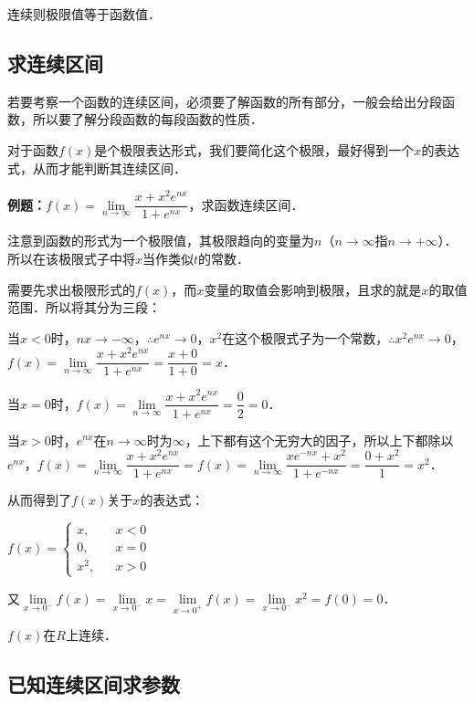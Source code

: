 

连续则极限值等于函数值．

\subsection{求连续区间}

若要考察一个函数的连续区间，必须要了解函数的所有部分，一般会给出分段函数，所以要了解分段函数的每段函数的性质．

对于函数$f(x)$是个极限表达形式，我们要简化这个极限，最好得到一个$x$的表达式，从而才能判断其连续区间．

\textbf{例题：}$f(x)=\lim\limits_{n\to\infty}\dfrac{x+x^2e^{nx}}{1+e^{nx}}$，求函数连续区间．

注意到函数的形式为一个极限值，其极限趋向的变量为$n$（$n\to\infty$指$n\to+\infty$）．所以在该极限式子中将$x$当作类似$t$的常数．

需要先求出极限形式的$f(x)$，而$x$变量的取值会影响到极限，且求的就是$x$的取值范围．所以将其分为三段：

当$x<0$时，$nx\to-\infty$，$\therefore e^{nx}\to 0$，$x^2$在这个极限式子为一个常数，$\therefore x^2e^{nx}\to 0$，$f(x)=\lim\limits_{n\to\infty}\dfrac{x+x^2e^{nx}}{1+e^{nx}}=\dfrac{x+0}{1+0}=x$．

当$x=0$时，$f(x)=\lim\limits_{n\to\infty}\dfrac{x+x^2e^{nx}}{1+e^{nx}}=\dfrac{0}{2}=0$．

当$x>0$时，$e^{nx}$在$n\to\infty$时为$\infty$，上下都有这个无穷大的因子，所以上下都除以$e^{nx}$，$f(x)=\lim\limits_{n\to\infty}\dfrac{x+x^2e^{nx}}{1+e^{nx}}=f(x)=\lim\limits_{n\to\infty}\dfrac{xe^{-nx}+x^2}{1+e^{-nx}}=\dfrac{0+x^2}{1}=x^2$．

从而得到了$f(x)$关于$x$的表达式：

$f(x)=\left\{\begin{array}{lcl}
        x,   &  & x<0 \\
        0,   &  & x=0 \\
        x^2, &  & x>0
    \end{array}
    \right.$

又$\lim\limits_{x\to 0^-}f(x)=\lim\limits_{x\to 0^-}x=\lim\limits_{x\to 0^+}f(x)=\lim\limits_{x\to 0^-}x^2=f(0)=0$．

$f(x)$在$R$上连续．

\subsection{已知连续区间求参数}

